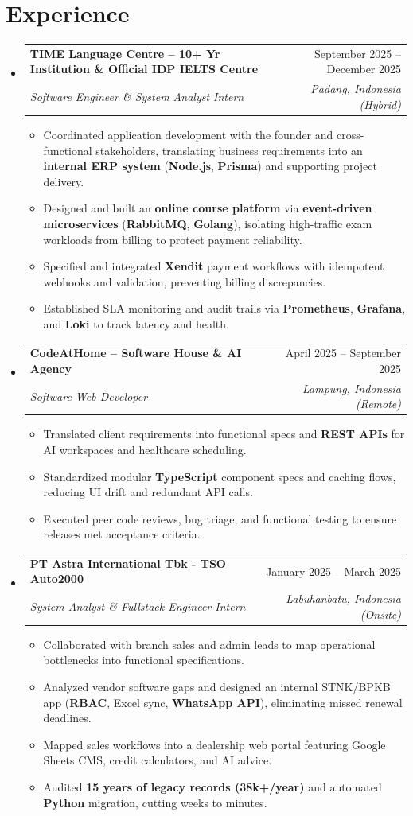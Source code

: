 \documentclass[letterpaper,11pt]{article}
\makeatletter
\newcommand{\resumeItem}[1]{\item\small{#1}}
\newcommand{\resumeSubheading}[4]{
  \item
    \begin{tabular*}{\textwidth}[t]{l@{\extracolsep{\fill}}r}
      \textbf{#1} & #2 \\
      \textit{\small#3} & \textit{\small #4} \\
    \end{tabular*}\vspace{-1.2pt}
}
\newcommand{\resumeSubHeadingListStart}{\begin{itemize}[leftmargin=0in, label={}, itemsep=1.2pt, parsep=0pt, topsep=0.5pt]}
\newcommand{\resumeSubHeadingListEnd}{\end{itemize}\vspace{-1.5pt}}
\newcommand{\resumeItemListStart}{\begin{itemize}[leftmargin=15pt, label=\tiny$\bullet$, itemsep=1.1pt, parsep=0pt, topsep=0.5pt]}
\newcommand{\resumeItemListEnd}{\end{itemize}}
\makeatother
\begin{document}
\section{Experience}
  \resumeSubHeadingListStart
    \resumeSubheading
      {TIME Language Centre \textnormal{\small -- 10+ Yr Institution \& Official IDP IELTS Centre}}{September 2025 -- December 2025}
      {Software Engineer \& System Analyst Intern}{Padang, Indonesia (Hybrid)}
      \resumeItemListStart
        \resumeItem{Coordinated application development with the founder and cross-functional stakeholders, translating business requirements into an \textbf{internal ERP system} (\textbf{Node.js}, \textbf{Prisma}) and supporting project delivery.}
        \resumeItem{Designed and built an \textbf{online course platform} via \textbf{event-driven microservices} (\textbf{RabbitMQ}, \textbf{Golang}), isolating high-traffic exam workloads from billing to protect payment reliability.}
        \resumeItem{Specified and integrated \textbf{Xendit} payment workflows with idempotent webhooks and validation, preventing billing discrepancies.}
        \resumeItem{Established SLA monitoring and audit trails via \textbf{Prometheus}, \textbf{Grafana}, and \textbf{Loki} to track latency and health.}
      \resumeItemListEnd 

    \resumeSubheading
      {CodeAtHome \textnormal{\small -- Software House \& AI Agency}}{April 2025 -- September 2025}
      {Software Web Developer}{Lampung, Indonesia (Remote)}
      \resumeItemListStart
        \resumeItem{Translated client requirements into functional specs and \textbf{REST APIs} for AI workspaces and healthcare scheduling.}
        \resumeItem{Standardized modular \textbf{TypeScript} component specs and caching flows, reducing UI drift and redundant API calls.}
        \resumeItem{Executed peer code reviews, bug triage, and functional testing to ensure releases met acceptance criteria.}
      \resumeItemListEnd

    \resumeSubheading
      {PT Astra International Tbk - TSO Auto2000}{January 2025 -- March 2025}
      {System Analyst \& Fullstack Engineer Intern}{Labuhanbatu, Indonesia (Onsite)}
      \resumeItemListStart
        \resumeItem{Collaborated with branch sales and admin leads to map operational bottlenecks into functional specifications.}
        \resumeItem{Analyzed vendor software gaps and designed an internal STNK/BPKB app (\textbf{RBAC}, Excel sync, \textbf{WhatsApp API}), eliminating missed renewal deadlines.}
        \resumeItem{Mapped sales workflows into a dealership web portal featuring Google Sheets CMS, credit calculators, and AI advice.}
        \resumeItem{Audited \textbf{15 years of legacy records (38k+/year)} and automated \textbf{Python} migration, cutting weeks to minutes.}
      \resumeItemListEnd
  \resumeSubHeadingListEnd
\end{document}
